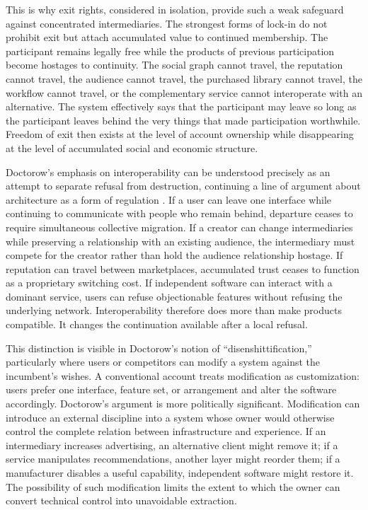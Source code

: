\documentclass[11pt]{article}
\begin{document}
This is why exit rights, considered in isolation, provide such a weak safeguard against concentrated intermediaries. The strongest forms of lock-in do not prohibit exit but attach accumulated value to continued membership. The participant remains legally free while the products of previous participation become hostages to continuity. The social graph cannot travel, the reputation cannot travel, the audience cannot travel, the purchased library cannot travel, the workflow cannot travel, or the complementary service cannot interoperate with an alternative. The system effectively says that the participant may leave so long as the participant leaves behind the very things that made participation worthwhile. Freedom of exit then exists at the level of account ownership while disappearing at the level of accumulated social and economic structure.

Doctorow's emphasis on interoperability can be understood precisely as an attempt to separate refusal from destruction, continuing a line of argument about architecture as a form of regulation \parencite{lessig2006code,wu2010master}. If a user can leave one interface while continuing to communicate with people who remain behind, departure ceases to require simultaneous collective migration. If a creator can change intermediaries while preserving a relationship with an existing audience, the intermediary must compete for the creator rather than hold the audience relationship hostage. If reputation can travel between marketplaces, accumulated trust ceases to function as a proprietary switching cost. If independent software can interact with a dominant service, users can refuse objectionable features without refusing the underlying network. Interoperability therefore does more than make products compatible. It changes the continuation available after a local refusal.

This distinction is visible in Doctorow's notion of ``disenshittification,'' particularly where users or competitors can modify a system against the incumbent's wishes. A conventional account treats modification as customization: users prefer one interface, feature set, or arrangement and alter the software accordingly. Doctorow's argument is more politically significant. Modification can introduce an external discipline into a system whose owner would otherwise control the complete relation between infrastructure and experience. If an intermediary increases advertising, an alternative client might remove it; if a service manipulates recommendations, another layer might reorder them; if a manufacturer disables a useful capability, independent software might restore it. The possibility of such modification limits the extent to which the owner can convert technical control into unavoidable extraction.
\end{document}

